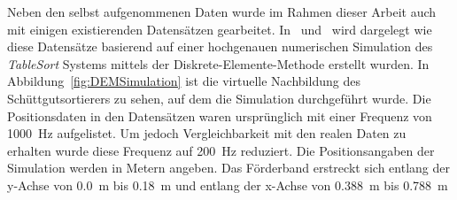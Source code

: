 
Neben den selbst aufgenommenen Daten wurde im Rahmen dieser Arbeit auch mit einigen existierenden Datensätzen gearbeitet.
In \cite{pieper2016numerical}~und~\cite{pieper2017numerical} wird dargelegt wie diese Datensätze basierend auf einer hochgenauen numerischen Simulation des \textit{TableSort} Systems mittels der Diskrete-Elemente-Methode erstellt wurden.
In Abbildung~\ref{fig:DEMSimulation} ist die virtuelle Nachbildung des Schüttgutsortierers zu sehen, auf dem die Simulation durchgeführt wurde.
Die Positionsdaten in den Datensätzen waren ursprünglich mit einer Frequenz von \SI{1000}{\hertz} aufgelistet.
Um jedoch Vergleichbarkeit mit den realen Daten zu erhalten wurde diese Frequenz auf \SI{200}{\hertz} reduziert.
Die Positionsangaben der Simulation werden in Metern angeben.
Das Förderband erstreckt sich entlang der y-Achse von \SI{0.0}{\meter} bis \SI{0.18}{\meter} und entlang der x-Achse von \SI{0.388}{\meter} bis \SI{0.788}{\meter} 

